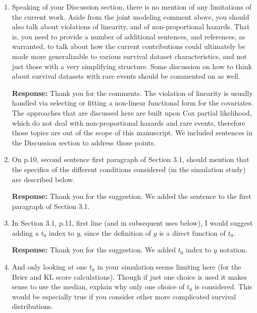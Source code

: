 \documentclass[12]{article}
\newcommand{\re}{\textbf{Response: }}
\begin{document}
\begin{enumerate}[align = left]
\begin{enumerate}
        \re Thank you for this comment. We included additional simulation results in the supplementary material where the baseline hazard is generated from Weibull and Gompertz distribution. The overall conclusions do not change for both of these more complex distributional form.
        
    \end{enumerate}

\item Speaking of your Discussion section, there is no mention of any limitations of the current work. Aside from the joint modeling comment above, you should also talk about violations of linearity, and of non-proportional hazards. That is, you need to provide a number of additional sentences, and references, as warranted, to talk about how the current contributions could ultimately be made more generalizable to various survival dataset characteristics, and not just those with a very simplifying structure. Some discussion on how to think about survival datasets with rare events should be commented on as well.

\re Thank you for the comments. The violation of linearity is usually handled via selecting or fitting a non-linear functional form for the covariates. The approaches that are discussed here are built upon Cox partial likelihood, which do not deal with non-proportional hazards and rare events, therefore those topics are out of the scope of this manuscript.  We included sentences in the Discussion section to address those points.

\item On p.10, second sentence first paragraph of Section 3.1, should mention that the specifics of the different conditions considered (in the simulation study) are described below.

\re Thank you for the suggestion. We added the sentence to the first paragraph of Section 3.1.

\item In Section 3.1, p.11, first line (and in subsequent uses below), I would suggest adding a $t_0$ index to $y$, since the definition of $y$ is a direct function of $t_0$.

\re Thank you for the suggestion. We added $t_0$ index to $y$ notation.

\item And only looking at one $t_0$ in your simulation seems limiting here (for the Brier and KL score calculations). Though if just one choice is used it makes sense to use the median, explain why only one choice of $t_0$ is considered.  This would be especially true if you consider other more complicated survival distributions.


\end{enumerate}
\end{document}
